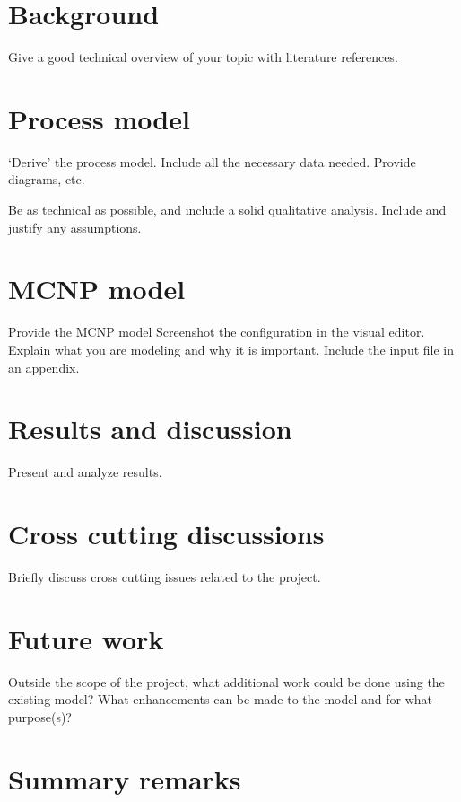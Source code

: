 \documentclass[11pt,a4paper]{article}
\begin{document}
\section{Background} \label{background}
Give a good technical overview of your topic with literature references.

\newpage

\section{Process model} \label{process-model}
`Derive' the process model. Include all the necessary data needed. Provide diagrams, etc.

Be as technical as possible, and include a solid qualitative analysis. Include and justify any assumptions.

\newpage

\section{MCNP model} \label{mcnp-model}
Provide the MCNP model Screenshot the configuration in the visual editor. Explain what you are modeling and why it is important. Include the input file in an appendix.

\newpage

\section{Results and discussion} \label{results-discussion}
Present and analyze results.

\newpage

\section{Cross cutting discussions} \label{cross-cutting}
Briefly discuss cross cutting issues related to the project.

\newpage

\section{Future work} \label{future-work}
Outside the scope of the project, what additional work could be done using the existing model? What enhancements can be made to the model and for what purpose(s)?

\section{Summary remarks} \label{summary-remarks}
\end{document}
